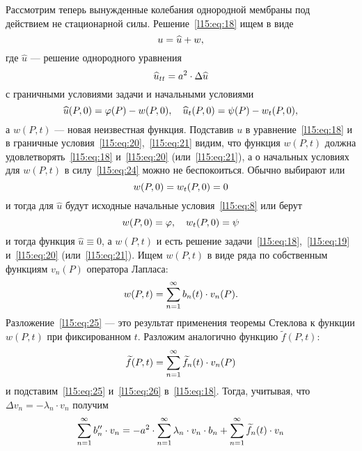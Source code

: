 Рассмотрим теперь вынужденные колебания однородной мембраны под действием не стационарной силы. Решение~\eqref{l15:eq:18} ищем в виде
\begin{equation*}
	\hfill u=\widehat{u}+w,\hfill
\end{equation*}
где $\widehat{u}$ --- решение однородного уравнения
\begin{equation*}
	\hfill \widehat{u}_{tt}=a^2\cdot\Delta\widehat{u}\hfill
\end{equation*}
с граничными условиями задачи и начальными условиями 
\begin{equation}\label{l15:eq:24}
	\hfill\widehat{u}(P,0)=\phi(P)-w(P,0),\quad \widehat{u}_t(P,0)=\psi(P)-w_t(P,0),\hfill
\end{equation}
а $w(P,t)$ --- новая неизвестная функция. Подставив $u$ в уравнение~\eqref{l15:eq:18} и в граничные условия~\eqref{l15:eq:20},~\eqref{l15:eq:21} видим, что функция $w(P,t)$ должна удовлетворять~\eqref{l15:eq:18} и~\eqref{l15:eq:20} (или~\eqref{l15:eq:21}), а о начальных условиях для $w(P,t)$ в силу~\eqref{l15:eq:24} можно не беспокоиться. Обычно выбирают или
\begin{equation*}
	\hfill w(P,0)=w_t(P,0)=0\hfill
\end{equation*} 
и тогда для $\widehat{u}$ будут исходные начальные условия~\eqref{l15:eq:8} или берут 
\begin{equation*}
	\hfill w(P,0)=\phi,\quad w_t(P,0)=\psi\hfill
\end{equation*} 
и тогда функция $\widehat{u}\equiv0$, а $w(P,t)$ и есть решение задачи~\eqref{l15:eq:18},~\eqref{l15:eq:19} и~\eqref{l15:eq:20} (или~\eqref{l15:eq:21}). Ищем $w(P,t)$ в виде ряда по собственным функциям $v_n(P)$ оператора Лапласа:
\begin{equation}\label{l15:eq:25}
	\hfill w(P,t)=\sum\limits_{n=1}^{\infty}b_n(t)\cdot v_n(P).\hfill
\end{equation}
Разложение~\eqref{l15:eq:25} --- это результат применения теоремы Стеклова к функции $w(P,t)$ при фиксированном $t$. Разложим аналогично функцию $\widetilde{f}(P,t)$:
\begin{equation}\label{l15:eq:26}
	\hfill\widetilde{f}(P,t)=\sum\limits_{n=1}^{\infty}\widetilde{f}_n(t)\cdot v_n(P)\hfill
\end{equation}
и подставим~\eqref{l15:eq:25} и~\eqref{l15:eq:26} в~\eqref{l15:eq:18}. Тогда, учитывая, что $\Delta v_n=-\lambda_n\cdot v_n$ получим 
\begin{equation*}
	\hfill\sum\limits_{n=1}^{\infty}b_n''\cdot v_n=-a^2\cdot\sum\limits_{n=1}^{\infty}\lambda_n\cdot v_n\cdot b_n+\sum\limits_{n=1}^{\infty}\widetilde{f}_n(t)\cdot v_n\hfill
\end{equation*}
